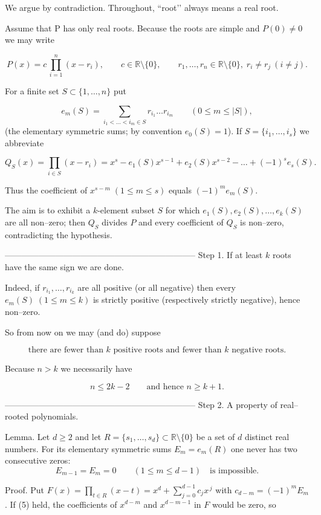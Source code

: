 We argue by contradiction.  
Throughout, “root’’ always means a real root.

Assume that ​P has only real roots.  
Because the roots are simple and \(P(0)\neq 0\) we may write  

\[
P(x)=c\,\prod_{i=1}^{n}(x-r_i),\qquad c\in\mathbb R\setminus\{0\},
\qquad r_1,\dots ,r_n\in\mathbb R\setminus\{0\},\;
r_i\neq r_j\ (i\neq j).
\tag{1}
\]

For a finite set \(S\subset\{1,\dots ,n\}\) put  

\[
e_m(S)=\!\!\sum_{i_1<\dots <i_m\in S}\!\! r_{i_1}\dots r_{i_m}\qquad(0\le m\le |S|),
\]
(the elementary symmetric sums; by convention \(e_0(S)=1\)).
If \(S=\{i_1,\dots ,i_s\}\) we abbreviate  

\[
Q_S(x)=\prod_{i\in S}(x-r_i)=x^s- e_1(S)x^{s-1}+e_2(S)x^{s-2}-\dots +(-1)^s e_s(S).
\tag{2}
\]

Thus the coefficient of \(x^{s-m}\;(1\le m\le s )\) equals \((-1)^m e_m(S)\).

The aim is to exhibit a \(k\)-element subset \(S\) for which  
\(e_1(S),e_2(S),\dots ,e_k(S)\) are all non–zero; then \(Q_S\) divides \(P\)
and every coefficient of \(Q_S\) is non–zero, contradicting the hypothesis.

--------------------------------------------------------------------
Step 1.  If at least \(k\) roots have the same sign we are done.

Indeed, if \(r_{i_1},\dots ,r_{i_k}\) are all positive (or all negative) then every
\(e_m(S)\;(1\le m\le k)\) is strictly positive (respectively strictly negative),
hence non–zero.

So from now on we may (and do) suppose

\[
\text{there are fewer than }k\text{ positive roots and fewer than }k\text{ negative roots.}
\tag{3}
\]

Because \(n>k\) we necessarily have  

\[
n\le 2k-2\qquad\text{and hence }n\ge k+1.
\tag{4}
\]

--------------------------------------------------------------------
Step 2.  A property of real–rooted polynomials.

Lemma.  
Let \(d\ge 2\) and let \(R=\{s_1,\dots ,s_d\}\subset\mathbb R\setminus\{0\}\)
be a set of \(d\) distinct real numbers.  
For its elementary symmetric sums \(E_m=e_m(R)\) one never has two
consecutive zeros:
\[
E_{m-1}=E_{m}=0\qquad(1\le m\le d-1)\quad\text{is impossible.}
\tag{5}
\]

Proof.  
Put \(F(x)=\prod_{t\in R}(x-t)=x^d+\sum_{j=0}^{d-1}c_jx^{\,j}\)
with \(c_{d-m}=(-1)^mE_m\).
If (5) held, the coefficients of \(x^{d-m}\) and \(x^{d-m-1}\) in \(F\)
would be zero, so  

